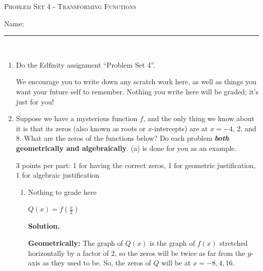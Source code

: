 \documentclass{article}
\newcommand{\doedfinity}[2][\newpage]{
  \begin{problem}[#1]
    Do the Edfinity assignment ``Problem Set #2''.

    We encourage you to write down any scratch work here, as well as
    things you want your future self to remember. Nothing you write
    here will be graded; it's just for you!
  \end{problem}
}
\begin{document}
\begin{center}
  \large\textsc{Problem Set 4 - Transforming Functions}\vspace{.5in}
  
  \large Name: \rule{5cm}{0.15mm}\\

\end{center}

\begin{enumerate}
\item  {}

  \doedfinity{4}

\item  %

  Suppose we have a mysterious function $f$, and the only thing we know about it is that its zeros (also known as roots or $x$-intercepts) are at $x = -4$, $2$, and $8$. What are the zeros of the functions below? Do each problem \textbf{\emph{both} geometrically and algebraically}. (a) is done for you as an example.

  \begin{grading}
    3 points per part: 1 for having the correct zeros, 1 for geometric justification, 1 for algebraic justification 
  \end{grading}

  \begin{enumerate}
  \item

    \begin{grading}
      Nothing to grade here
    \end{grading}

    \begin{problem}
      $ Q(x) = f\left(\frac{x}{2}\right)$
    \end{problem}

    \textbf{Solution.}

    \textbf{Geometrically:} The graph of $Q(x)$ is the graph of $f(x)$ stretched horizontally by a factor of 2, so the zeros will be twice as far from the $y$-axis as they used to be. So, the zeros of $Q$ will be at $x = -8 , 4, 16$.


\end{enumerate}
\end{enumerate}
\end{document}
